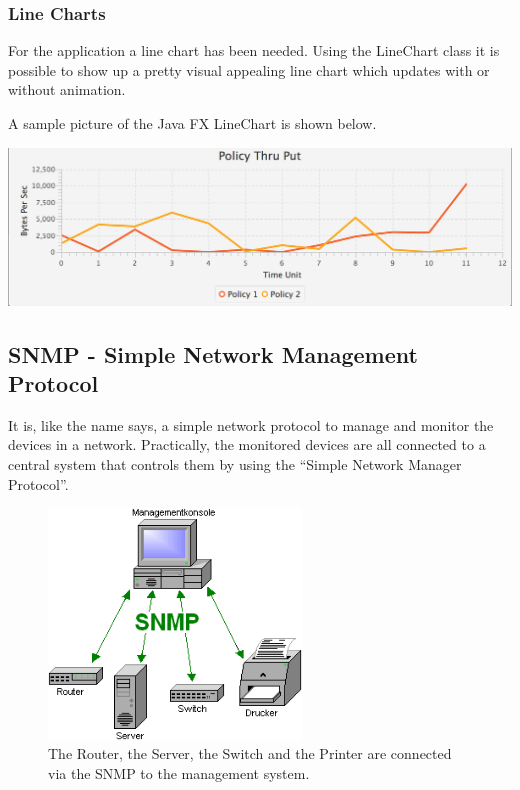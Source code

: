 \documentclass[11pt, a4paper]{article}
\begin{document}
\subsubsection{Line Charts}

For the application a line chart has been needed. Using the LineChart class it is possible to show up a pretty visual appealing line chart which updates with or without animation.

A sample picture of the Java FX LineChart is shown below. 

\includegraphics[width=\textwidth]{images/linechart.png}


\subsection{SNMP - Simple Network Management Protocol}

It is, like the name says, a simple network protocol to manage and monitor the devices in a network. Practically, the monitored devices are all connected to a central system that controls them by using the “Simple Network Manager Protocol”.

\begin{figure}[h!]
	\centering
	\includegraphics[width=0.6\textwidth]{images/SNMP-Managementkonsole.png}
	\caption{The Router, the Server, the Switch and the Printer are connected via the SNMP to the management system.}
\end{figure}
\end{document}
